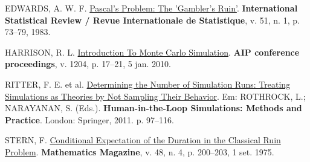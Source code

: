 \documentclass[
  brazilian,
  12pt,
]{article}
\newlength{\cslhangindent}
\newenvironment{CSLReferences}[2] %
 {\begin{list}{}{%
  \setlength{\itemindent}{0pt}
  \setlength{\leftmargin}{0pt}
  \setlength{\parsep}{0pt}
  \ifodd #1
   \setlength{\leftmargin}{\cslhangindent}
   \setlength{\itemindent}{-1\cslhangindent}
  \fi
  \setlength{\itemsep}{#2\baselineskip}}}
 {\end{list}}
\theoremstyle{definition}
\theoremstyle{definition}
\theoremstyle{remark}
\begin{document}
\label{refs}
\begin{CSLReferences}{0}{1}
EDWARDS, A. W. F. \href{https://doi.org/10.2307/1402732}{Pascal's
Problem: The 'Gambler's Ruin'}. \textbf{International Statistical Review
/ Revue Internationale de Statistique}, v. 51, n. 1, p. 73--79, 1983.

HARRISON, R. L. \href{https://doi.org/10.1063/1.3295638}{Introduction To
Monte Carlo Simulation}. \textbf{{AIP} conference proceedings}, v. 1204,
p. 17--21, 5 jan. 2010.

RITTER, F. E. et al.
\href{https://doi.org/10.1007/978-0-85729-883-6_5}{Determining the
Number of Simulation Runs: Treating Simulations as Theories by Not
Sampling Their Behavior}. Em: ROTHROCK, L.; NARAYANAN, S. (Eds.).
\textbf{Human-in-the-Loop Simulations: Methods and Practice}. London:
Springer, 2011. p. 97--116.

STERN, F.
\href{https://doi.org/10.1080/0025570X.1975.11976486}{Conditional
Expectation of the Duration in the Classical Ruin Problem}.
\textbf{Mathematics Magazine}, v. 48, n. 4, p. 200--203, 1 set. 1975.

\end{CSLReferences}
\end{document}
